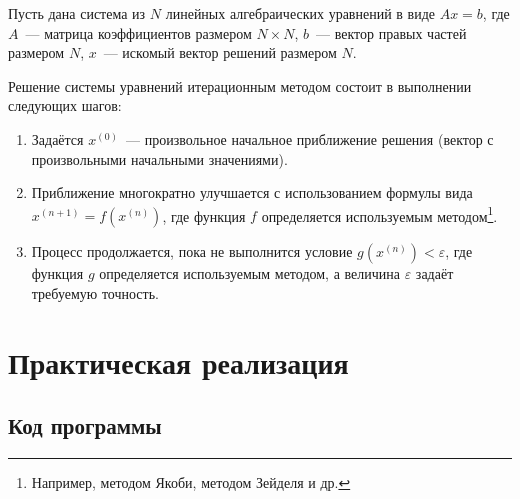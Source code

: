 \documentclass[a4paper, 14pt]{extarticle}
\begin{document}
Пусть дана система из $N$ линейных алгебраических уравнений в виде $Ax = b$, где $A$~--- матрица коэффициентов размером $N \times N$, $b$~--- вектор правых частей размером $N$, $x$~--- искомый вектор решений размером $N$.

Решение системы уравнений итерационным методом состоит в выполнении следующих шагов:
\begin{enumerate}
    \item Задаётся $x^{(0)}$~--- произвольное начальное приближение решения (вектор с произвольными начальными значениями).
    \item Приближение многократно улучшается с использованием формулы вида $x^{(n+1)} = f(x^{(n)})$, где функция $f$ определяется используемым методом\footnote{Например, методом Якоби, методом Зейделя и др.}.
    \item Процесс продолжается, пока не выполнится условие $g(x^{(n)}) < \varepsilon$, где функция $g$ определяется используемым методом, а величина $\varepsilon$ задаёт требуемую точность.
\end{enumerate}

\section*{Практическая реализация}\label{Sect::implementation}

\subsection*{Код программы}\label{Subsect::source_code}
\end{document}
